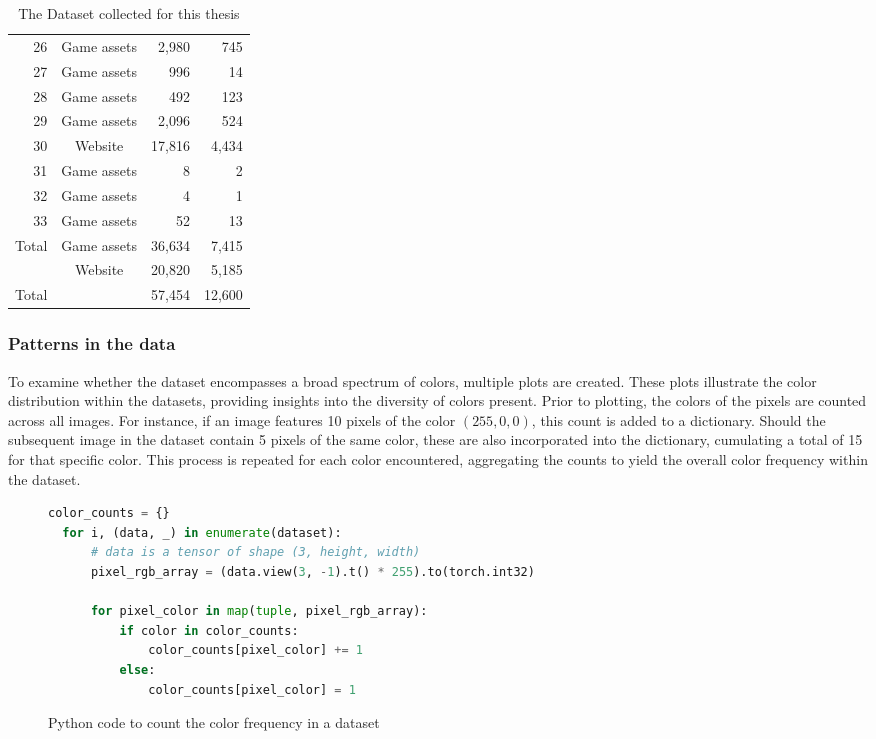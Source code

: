 \begin{table}[H]
\begin{adjustbox}{width=0.8\textwidth}
\begin{tabular}{|r|c|r|r|}
              26 & Game assets & 2,980 & 745 \\
              27 & Game assets & 996 & 14 \\
              28 & Game assets & 492 & 123 \\
              29 & Game assets & 2,096 & 524 \\
              30 & Website & 17,816 & 4,434 \\
              31 & Game assets & 8 & 2 \\
              32 & Game assets & 4 & 1 \\
              33 & Game assets & 52 & 13 \\
              \hline
              Total & Game assets & 36,634 & 7,415 \\
                    & Website & 20,820 & 5,185 \\
              \hline
              Total & & 57,454 & 12,600 \\
              \hline
          \end{tabular}
        \end{adjustbox}
        \caption{The Dataset collected for this thesis}
        \label{tab:datasets}
    \end{table}

    \subsubsection{Patterns in the data}
    
    To examine whether the dataset encompasses a broad spectrum of colors, multiple plots are created. These plots illustrate the color distribution within the datasets, providing insights into the diversity of colors present. Prior to plotting, the colors of the pixels are counted across all images. For instance, if an image features 10 pixels of the color $(255, 0, 0)$, this count is added to a dictionary. Should the subsequent image in the dataset contain 5 pixels of the same color, these are also incorporated into the dictionary, cumulating a total of 15 for that specific color. This process is repeated for each color encountered, aggregating the counts to yield the overall color frequency within the dataset.

\begin{figure}[H]
\centering
\begin{lstlisting}[language=Python]
  color_counts = {} 
  for i, (data, _) in enumerate(dataset):
      # data is a tensor of shape (3, height, width) 
      pixel_rgb_array = (data.view(3, -1).t() * 255).to(torch.int32)
      
      for pixel_color in map(tuple, pixel_rgb_array):
          if color in color_counts:
              color_counts[pixel_color] += 1
          else:
              color_counts[pixel_color] = 1
\end{lstlisting}
\caption{Python code to count the color frequency in a dataset}
\label{fig:color_count}
\end{figure}

